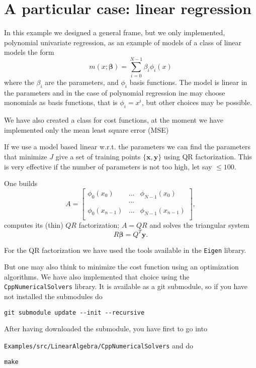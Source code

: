\documentclass{article}
\begin{document}
 
 \section{A particular case: linear regression}
In this example we designed a general frame, but we only implemented, polynomial univariate regression, as an example of models of a class of linear models the form
\begin{equation}
m(x;\boldsymbol{\beta})=\sum_{i=0}^{N-1} \beta_i\phi_i(x)
\end{equation}
where the $\beta_i$ are the parameters, and $\phi_i$ basis functions.
The model is linear in the parameters and in the case of polynomial regression ine may choose monomials as basis functions, that is $\phi_i=x^i$, but other choices may be possible.



We have also created a class for cost functions, at the moment we have implemented only the mean least square error (MSE)

If we use a model based linear w.r.t. the parameters we can find the parameters that minimize $J$ give a set of training points $\{\mathbf{x},\mathbf{y}\}$
using QR factorization. This is very effective if the number of parameters is not too high, let say $\le 100$.

One builds
\[
A=\begin{bmatrix}
\phi_0(x_0)&\ldots&\phi_{N-1}(x_{0})\\
&\cdots &\\
\phi_0(x_{n-1})&\ldots&\phi_{N-1}(x_{n-1})\\
\end{bmatrix},
\]
computes its (thin) $QR$ factorization; $A=QR$ and solves the triangular system
\[
R\boldsymbol{\beta}=Q^T\mathbf{y}.
\]

For the QR factorization we have used the tools available in the \texttt{Eigen} library.

But one may also think to minimize the cost function using an optimization algorithms.
We have also implemented that choice using the \texttt{CppNumericalSolvers} library. It is available as a git submodule, so if you have not installed the submodules
do
\begin{verbatim}
git submodule update --init --recursive
\end{verbatim}

After having downloaded the submodule, you have first to go into

\texttt{Examples/src/LinearAlgebra/CppNumericalSolvers} and do
\begin{verbatim}
make
\end{verbatim}
\end{document}
